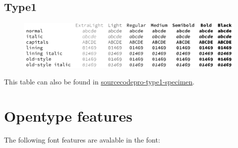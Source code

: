 \documentclass[10pt,a4paper,english]{article}
\newcommand*\file[1]{\href{run:#1.pdf}{#1}}
\begin{document}
\subsection{Type1}
\begin{figure}[ht]
	\centering
	\includegraphics[width=\linewidth]{sourcecodepro-type1-specimen}
\end{figure}
This table can also be found in \file{sourcecodepro-type1-specimen}.

\newpage
\section{Opentype features}
\label{sec:otfinfo}

\newcommand*\textfeat[2]{{\sourcecodepro\addfontfeature{RawFeature=+#1}#2}}
The following font features are avalable in the font:
\end{document}
